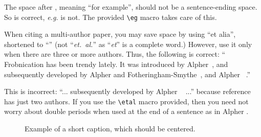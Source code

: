 \documentclass[10pt,twocolumn,letterpaper]{article}
\begin{document}
The space after \eg, meaning ``for example'', should not be a
sentence-ending space. So \eg is correct, {\em e.g.} is not.  The provided
\verb'\eg' macro takes care of this.

When citing a multi-author paper, you may save space by using ``et alia'',
shortened to ``\etal'' (not ``{\em et.\ al.}'' as ``{\em et}'' is a complete word.)
However, use it only when there are three or more authors.  Thus, the
following is correct: ``
   Frobnication has been trendy lately.
   It was introduced by Alpher~\cite{Alpher02}, and subsequently developed by
   Alpher and Fotheringham-Smythe~\cite{Alpher03}, and Alpher \etal~\cite{Alpher04}.''

This is incorrect: ``... subsequently developed by Alpher \etal~\cite{Alpher03} ...''
because reference~\cite{Alpher03} has just two authors.  If you use the
\verb'\etal' macro provided, then you need not worry about double periods
when used at the end of a sentence as in Alpher \etal.


\begin{figure*}
\begin{center}
\fbox{\rule{0pt}{2in} \rule{.9\linewidth}{0pt}}
\end{center}
   \caption{Example of a short caption, which should be centered.}
\label{fig:short}
\end{figure*}



{\small


}
\end{document}
